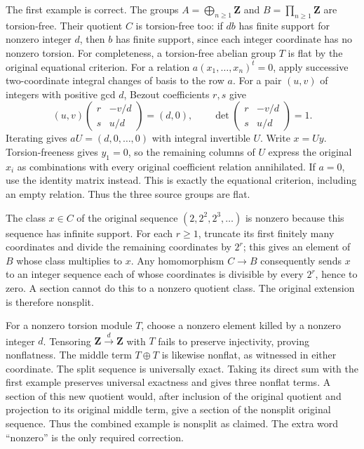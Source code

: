 The first example is correct. The groups \(A=\bigoplus_{n\geq1}\mathbf Z\) and \(B=\prod_{n\geq1}\mathbf Z\) are torsion-free. Their quotient \(C\) is torsion-free too: if \(d b\) has finite support for nonzero integer \(d\), then \(b\) has finite support, since each integer coordinate has no nonzero torsion. For completeness, a torsion-free abelian group \(T\) is flat by the original equational criterion. For a relation \(a(x_1,\ldots,x_n)^t=0\), apply successive two-coordinate integral changes of basis to the row \(a\). For a pair \((u,v)\) of integers with positive gcd \(d\), Bezout coefficients \(r,s\) give \[
(u,v)\begin{pmatrix}r&-v/d\\s&u/d\end{pmatrix}=(d,0),
\qquad \det\begin{pmatrix}r&-v/d\\s&u/d\end{pmatrix}=1.
\] Iterating gives \(aU=(d,0,\ldots,0)\) with integral invertible \(U\). Write \(x=Uy\). Torsion-freeness gives \(y_1=0\), so the remaining columns of \(U\) express the original \(x_i\) as combinations with every original coefficient relation annihilated. If \(a=0\), use the identity matrix instead. This is exactly the equational criterion, including an empty relation. Thus the three source groups are flat.

The class \(x\in C\) of the original sequence \((2,2^2,2^3,\ldots)\) is nonzero because this sequence has infinite support. For each \(r\geq1\), truncate its first finitely many coordinates and divide the remaining coordinates by \(2^r\); this gives an element of \(B\) whose class multiplies to \(x\). Any homomorphism \(C\to B\) consequently sends \(x\) to an integer sequence each of whose coordinates is divisible by every \(2^r\), hence to zero. A section cannot do this to a nonzero quotient class. The original extension is therefore nonsplit.

For a nonzero torsion module \(T\), choose a nonzero element killed by a nonzero integer \(d\). Tensoring \(\mathbf Z\xrightarrow{d}\mathbf Z\) with \(T\) fails to preserve injectivity, proving nonflatness. The middle term \(T\oplus T\) is likewise nonflat, as witnessed in either coordinate. The split sequence is universally exact. Taking its direct sum with the first example preserves universal exactness and gives three nonflat terms. A section of this new quotient would, after inclusion of the original quotient and projection to its original middle term, give a section of the nonsplit original sequence. Thus the combined example is nonsplit as claimed. The extra word ``nonzero'' is the only required correction.

